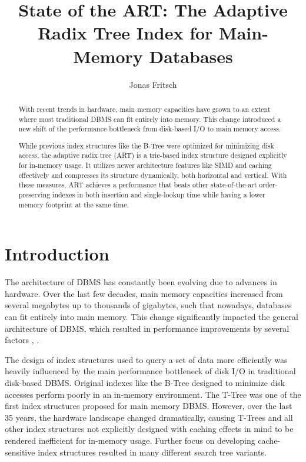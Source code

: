\documentclass[acmtog, nonacm]{acmart}
\begin{document}
\title{State of the ART: The Adaptive Radix Tree Index for Main-Memory Databases}

\author{Jonas Fritsch}

\begin{abstract}
    With recent trends in hardware, main memory capacities have grown to an extent where most traditional DBMS 
    can fit entirely into memory. This change introduced a new shift of the performance bottleneck 
    from disk-based I/O to main memory access.
    
    While previous index structures like the B-Tree were optimized for minimizing disk access, the 
    adaptive radix tree (ART) is a trie-based index structure designed explicitly for in-memory usage. 
    It utilizes newer architecture features like SIMD and caching effectively and compresses its structure 
    dynamically, both horizontal and vertical. With these measures, ART achieves a performance that beats 
    other state-of-the-art order-preserving indexes in both insertion and single-lookup time while having 
    a lower memory footprint at the same time.
\end{abstract}

\maketitle

\section{Introduction}
The architecture of DBMS has constantly been evolving due to advances in hardware. 
Over the last few decades, main memory capacities increased from several megabytes up to thousands 
of gigabytes, such that nowadays, databases can fit entirely into main memory. This change significantly 
impacted the general architecture of DBMS, which resulted in performance improvements 
by several factors \cite{10.1145/1376616.1376713}, \cite{7097722}.

The design of index structures used to query a set of data more efficiently was heavily influenced 
by the main performance bottleneck of disk I/O in traditional disk-based DBMS. 
Original indexes like the B-Tree designed to minimize disk accesses perform poorly 
in an in-memory environment. 
The T-Tree \cite{lehman1985study} was one of the first index structures proposed for main memory DBMS. 
However, over the last 35 years, the hardware landscape changed dramatically, causing T-Trees 
and all other index structures not explicitly designed with caching effects in mind to be rendered 
inefficient for in-memory usage\cite{rao1998cache}. Further focus on developing cache-sensitive index structures resulted in many 
different search tree variants.
\end{document}
